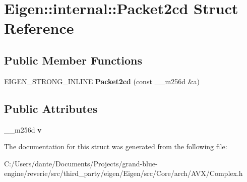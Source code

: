 \hypertarget{struct_eigen_1_1internal_1_1_packet2cd}{}\section{Eigen\+::internal\+::Packet2cd Struct Reference}
\label{struct_eigen_1_1internal_1_1_packet2cd}
\subsection*{Public Member Functions}
\begin{DoxyCompactItemize}
\item 
\mbox{\label{struct_eigen_1_1internal_1_1_packet2cd_a64efe67ea5b2f0a9bd10071ab02323b6}} 
E\+I\+G\+E\+N\+\_\+\+S\+T\+R\+O\+N\+G\+\_\+\+I\+N\+L\+I\+NE {\bfseries Packet2cd} (const \+\_\+\+\_\+m256d \&a)
\end{DoxyCompactItemize}
\subsection*{Public Attributes}
\begin{DoxyCompactItemize}
\item 
\mbox{\label{struct_eigen_1_1internal_1_1_packet2cd_a1986df7e3a3f8607144c754ae23a95ce}} 
\+\_\+\+\_\+m256d {\bfseries v}
\end{DoxyCompactItemize}


The documentation for this struct was generated from the following file\+:\begin{DoxyCompactItemize}
\item 
C\+:/\+Users/dante/\+Documents/\+Projects/grand-\/blue-\/engine/reverie/src/third\+\_\+party/eigen/\+Eigen/src/\+Core/arch/\+A\+V\+X/Complex.\+h\end{DoxyCompactItemize}
